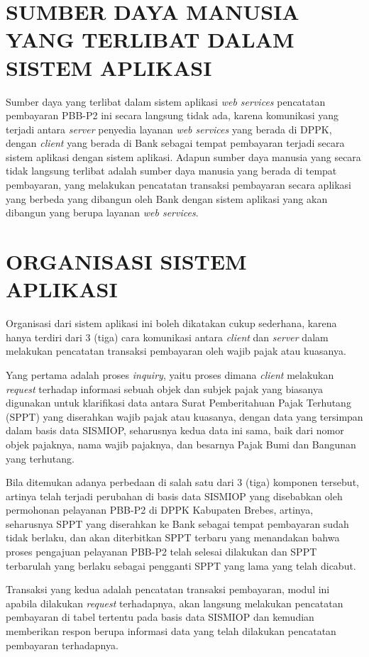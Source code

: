 \documentclass[pdftex,12pt, oneside]{article}
\begin{document}
\section{SUMBER DAYA MANUSIA YANG TERLIBAT DALAM SISTEM APLIKASI}

Sumber daya yang terlibat dalam sistem aplikasi \textit{web services} pencatatan pembayaran PBB-P2 ini secara langsung tidak ada, karena komunikasi yang terjadi antara \textit{server} penyedia layanan \textit{web services} yang berada di DPPK, dengan \textit{client} yang berada di Bank sebagai tempat pembayaran terjadi secara sistem aplikasi dengan sistem aplikasi. Adapun sumber daya manusia yang secara tidak langsung terlibat adalah sumber daya manusia yang berada di tempat pembayaran, yang melakukan pencatatan transaksi pembayaran secara aplikasi yang berbeda yang dibangun oleh Bank dengan sistem aplikasi yang akan dibangun yang berupa layanan \textit{web services}.


\section{ORGANISASI SISTEM APLIKASI}

Organisasi dari sistem aplikasi ini boleh dikatakan cukup sederhana, karena hanya terdiri dari 3 (tiga) cara komunikasi antara \textit{client} dan \textit{server} dalam melakukan pencatatan transaksi pembayaran oleh wajib pajak atau kuasanya.

Yang pertama adalah proses \textit{inquiry}, yaitu proses dimana \textit{client} melakukan \textit{request} terhadap informasi sebuah objek dan subjek pajak yang biasanya digunakan untuk klarifikasi data antara Surat Pemberitahuan Pajak Terhutang (SPPT) yang diserahkan wajib pajak atau kuasanya, dengan data yang tersimpan dalam basis data SISMIOP, seharusnya kedua data ini sama, baik dari nomor objek pajaknya, nama wajib pajaknya, dan besarnya Pajak Bumi dan Bangunan yang terhutang. 

Bila ditemukan adanya perbedaan di salah satu dari 3 (tiga) komponen tersebut, artinya telah terjadi perubahan di basis data SISMIOP yang disebabkan oleh permohonan pelayanan PBB-P2 di DPPK Kabupaten Brebes, artinya, seharusnya SPPT yang diserahkan ke Bank sebagai tempat pembayaran sudah tidak berlaku, dan akan diterbitkan SPPT terbaru yang menandakan bahwa proses pengajuan pelayanan PBB-P2 telah selesai dilakukan dan SPPT terbarulah yang berlaku sebagai pengganti SPPT yang lama yang telah dicabut.

Transaksi yang kedua adalah pencatatan transaksi pembayaran, modul ini apabila dilakukan \textit{request} terhadapnya, akan langsung melakukan pencatatan pembayaran di tabel tertentu pada basis data SISMIOP dan kemudian memberikan respon berupa informasi data yang telah dilakukan pencatatan pembayaran terhadapnya.
\end{document}
